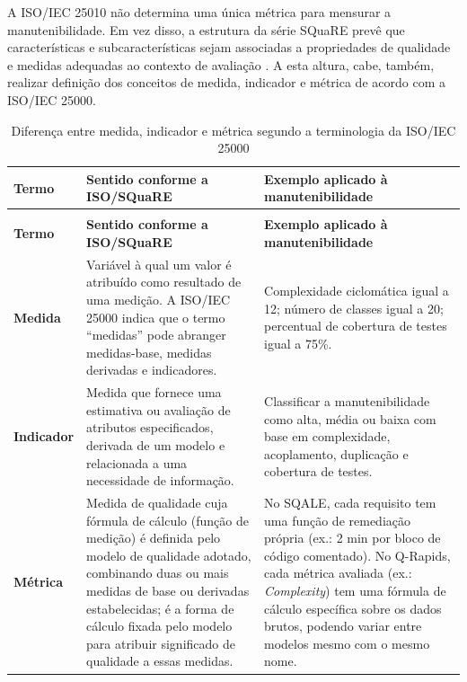 A ISO/IEC 25010 não determina uma única métrica para mensurar a manutenibilidade. Em vez disso, a estrutura da série SQuaRE prevê que características e subcaracterísticas sejam associadas a propriedades de qualidade e medidas adequadas ao contexto de avaliação \cite{isoiec25000}. A esta altura, cabe, também, realizar definição dos conceitos de medida, indicador e métrica de acordo com a ISO/IEC 25000.

{
\renewcommand{\arraystretch}{1.4}
\begin{longtable}{
    >{\raggedright\arraybackslash}p{2.8cm}
    >{\raggedright\arraybackslash}p{6.1cm}
    >{\raggedright\arraybackslash}p{6.1cm}
}
\caption{Diferença entre medida, indicador e métrica segundo a terminologia da ISO/IEC 25000} \label{tab:diferenca-medida-indicador-metrica} \\
\toprule
\textbf{Termo} & \textbf{Sentido conforme a ISO/SQuaRE} & \textbf{Exemplo aplicado à manutenibilidade} \\
\midrule
\endfirsthead
\multicolumn{3}{c}{{\bfseries \tablename\ \thetable{} -- Continuação da página anterior}} \\
\toprule
\textbf{Termo} & \textbf{Sentido conforme a ISO/SQuaRE} & \textbf{Exemplo aplicado à manutenibilidade} \\
\midrule
\endhead
\bottomrule
\endfoot
\bottomrule
\endlastfoot

\textbf{Medida} &
Variável à qual um valor é atribuído como resultado de uma medição. A ISO/IEC 25000 indica que o termo ``medidas'' pode abranger medidas-base, medidas derivadas e indicadores. &
Complexidade ciclomática igual a 12; número de classes igual a 20; percentual de cobertura de testes igual a 75\%. \\

\midrule

\textbf{Indicador} &
Medida que fornece uma estimativa ou avaliação de atributos especificados, derivada de um modelo e relacionada a uma necessidade de informação. &
Classificar a manutenibilidade como alta, média ou baixa com base em complexidade, acoplamento, duplicação e cobertura de testes. \\

\midrule

\textbf{Métrica} &
Medida de qualidade cuja fórmula de cálculo (função de medição) é definida pelo modelo de qualidade adotado, combinando duas ou mais medidas de base ou derivadas estabelecidas; é a forma de cálculo fixada pelo modelo para atribuir significado de qualidade a essas medidas. &
No SQALE, cada requisito tem uma função de remediação própria (ex.: 2 min por bloco de código comentado). No Q-Rapids, cada métrica avaliada (ex.: \textit{Complexity}) tem uma fórmula de cálculo específica sobre os dados brutos, podendo variar entre modelos mesmo com o mesmo nome. \\
\end{longtable}
}

